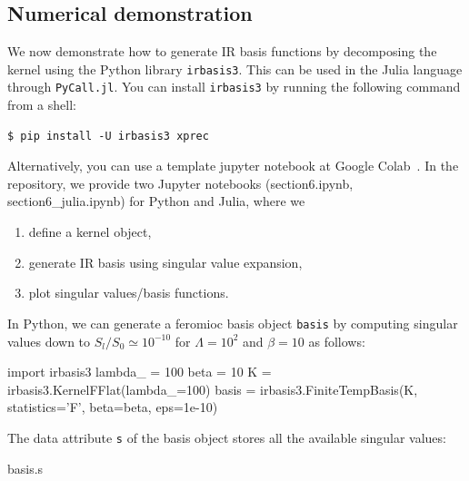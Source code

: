 \documentclass[submission, LectureNotes]{SciPost}
\begin{document}

\subsection{Numerical demonstration}
We now demonstrate how to generate IR basis functions by decomposing the kernel using the Python library
\texttt{irbasis3}.
This can be used in the Julia language through \texttt{PyCall.jl}.
You can install \texttt{irbasis3} by running the following command from a shell:
\begin{verbatim}
$ pip install -U irbasis3 xprec
\end{verbatim}
Alternatively, you can use a template jupyter notebook at Google Colab~\cite{colab-template}.
In the repository, we provide two Jupyter notebooks (section6.ipynb, section6\_julia.ipynb)
for Python and Julia, where we
\begin{enumerate}
    \item define a kernel object,
    \item generate IR basis using singular value expansion,
    \item plot singular values/basis functions.
\end{enumerate}

In Python, we can generate a feromioc basis object \texttt{basis}
by computing singular values down to $S_l/S_0 \simeq 10^{-10}$
for $\Lambda=10^2$ and $\beta=10$ as follows:
\begin{python}
import irbasis3
lambda_ = 100
beta = 10
K = irbasis3.KernelFFlat(lambda_=100)
basis = irbasis3.FiniteTempBasis(K, statistics='F', beta=beta, eps=1e-10)
\end{python}

The data attribute \texttt{s} of the basis object
stores all the available singular values:
\begin{python}
 basis.s
\end{python}
\end{document}
